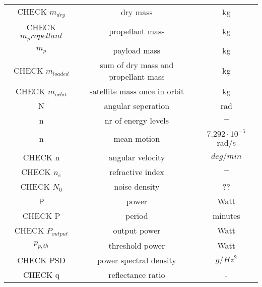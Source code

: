 \begin{center}
\begin{longtable}{c|c|c}
CHECK $m_{dry}$                           & dry mass                                    & kg \\

CHECK $m_propellant$								    	& propellant mass 														& kg \\

$m_p$ 															& payload mass 																& kg \\

CHECK $m_{loaded}$												& sum of dry mass and propellant mass					& kg \\

CHECK $m_{orbit}$                         & satellite mass once in orbit                & kg \\

N 																	& angular seperation 													& rad \\

n 																	& nr of energy levels 												& $-$ \\

n 																	& mean motion 																& $7.292\cdot 10^{ - 5}$ rad/s \\

CHECK n                                & angular velocity                             & $deg/{min}$ \\

CHECK $n_e$ 															& refractive index 														& $-$ \\

CHECK $N_0$                            & noise density                                & ?? \\

P 																	& power 																			& Watt \\

CHECK P                             & period                                      & minutes \\

CHECK $P_{output}$                       & output power                             & Watt \\

$p_{p,th}$ 													& threshold power 														& Watt \\

CHECK PSD                              & power spectral density                       & $g/{Hz^2}$ \\

CHECK q                               & reflectance ratio                              & - \\


\end{longtable}
\end{center}
